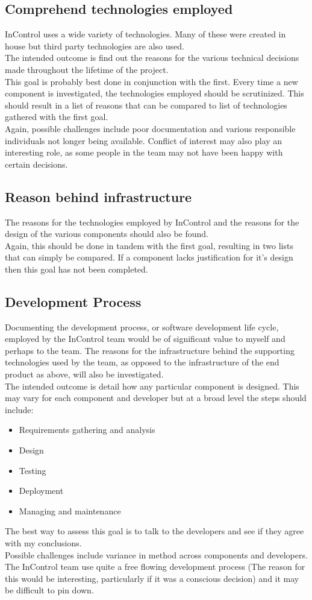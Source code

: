 \documentclass[a4paper,12pt, titlepage]{article}
\begin{document}
\subsection{Comprehend technologies employed}
InControl uses a wide variety of technologies. Many of these were created in house but third party technologies are also used.
\\The intended outcome is find out the reasons for the various technical decisions made throughout the lifetime of the project.
\\This goal is probably best done in conjunction with the first. Every time a new component is investigated, the technologies employed should be scrutinized. This should result in a list of reasons that can be compared to list of technologies gathered with the first goal.
\\Again, possible challenges include poor documentation and various responsible individuals not longer being available. Conflict of interest may also play an interesting role, as some people in the team may not have been happy with certain decisions. 

\subsection{Reason behind infrastructure}
The reasons for the technologies employed by InControl and the reasons for the design of the various components should also be found.
\\Again, this should be done in tandem with the first goal, resulting in two lists that can simply be compared. If a component lacks justification for it's design then this goal has not been completed.

\subsection{Development Process}
Documenting the development process, or software development life cycle, employed by the InControl team would be of significant value to myself and perhaps to the team. The reasons for the infrastructure behind the supporting technologies used by the team, as opposed to the infrastructure of the end product as above, will also be investigated.
\\The intended outcome is detail how any particular component is designed. This may vary for each component and developer but at a broad level the steps should include:
\begin{itemize}
\item Requirements gathering and analysis
\item Design
\item Testing
\item Deployment
\item Managing and maintenance
\end{itemize}
The best way to assess this goal is to talk to the developers and see if they agree with my conclusions.
\\Possible challenges include variance in method across components and developers. The InControl team use quite a free flowing development process (The reason for this would be interesting, particularly if it was a conscious decision) and it may be difficult to pin down.
\end{document}
